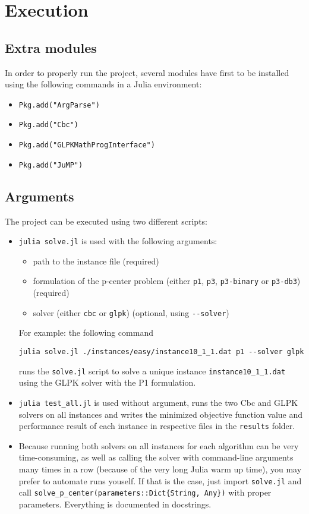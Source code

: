 \section{Execution}

\subsection{Extra modules}
In order to properly run the project, several modules have first to be installed using the following commands in a Julia environment:
\begin{itemize}
	\item \verb+Pkg.add("ArgParse")+
	\item \verb+Pkg.add("Cbc")+
	\item \verb+Pkg.add("GLPKMathProgInterface")+
	\item \verb+Pkg.add("JuMP")+
\end{itemize}

\subsection{Arguments}
The project can be executed using two different scripts:
\begin{itemize}
	\item \verb+julia solve.jl+ is used with the following arguments:
		\begin{itemize}
		\item path to the instance file (required)
		\item formulation of the p-center problem (either \verb+p1+, \verb+p3+, \verb+p3-binary+ or \verb+p3-db3+) (required)
		\item solver (either \verb+cbc+ or \verb+glpk+) (optional, using \verb+--solver+)
		\end{itemize}
	For example: the following command
	\begin{center}
		\verb+julia solve.jl ./instances/easy/instance10_1_1.dat p1 --solver glpk+
	\end{center}	 
	runs the \verb+solve.jl+ script to solve a unique instance \verb+instance10_1_1.dat+ using the GLPK solver with the P1 formulation. 
	\item \verb+julia test_all.jl+ is used without argument, runs the two Cbc and GLPK solvers on all instances and writes the minimized objective function value and performance result of each instance in respective files in the \verb+results+ folder.
	\item Because running both solvers on all instances for each algorithm can be very time-consuming, as well as calling
	the solver with command-line arguments many times in a row (because of the very long
	Julia warm up time), you may prefer to automate runs youself.
	If that is the case, just import \verb+solve.jl+ and call
	\verb+solve_p_center(parameters::Dict{String, Any})+ with proper
	parameters. Everything is documented in docstrings.
\end{itemize}